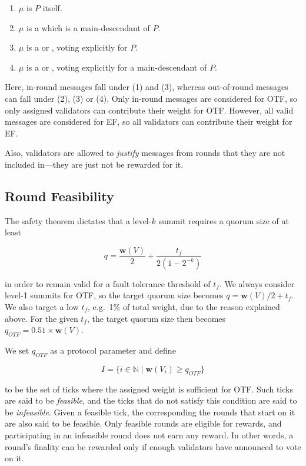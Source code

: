 \begin{enumerate}
\def\labelenumi{\arabic{enumi}.}
\item $\mu$ is $P$ itself.
\item $\mu$ is a \PROP which is a main-descendant of $P$.
\item $\mu$ is a \CONF or \WIT, voting explicitly for $P$.
\item $\mu$ is a \CONF or \WIT, voting explicitly for a main-descendant of $P$.
\end{enumerate}

Here, in-round messages fall under (1) and (3), whereas out-of-round messages can fall under (2), (3) or (4). Only in-round messages are considered for OTF, so only assigned validators can contribute their weight for OTF. However, all valid messages are considered for EF, so all validators can contribute their weight for EF.

Also, validators are allowed to \emph{justify} messages from rounds that they are not included in---they are just not be rewarded for it.

\subsection{Round Feasibility}
\label{sec:round-feasibility}

The safety theorem dictates that a level-$k$ summit requires a quorum size of at least

\begin{equation}
q = \frac{\boldsymbol{w}(V)}{2} + \frac{t_f}{2(1-2^{-k})}
\end{equation}

in order to remain valid for a fault tolerance threshold of $t_f$. We always consider level-1 summits for OTF, so the target quorum size becomes $q=\boldsymbol{w}(V)/2+t_f$. We also target a low $t_f$, e.g.~1\% of total weight, due to the reason explained above. For the given $t_f$, the target quorum size then becomes $q_{OTF} = 0.51 \times \boldsymbol{w}(V)$.

We set $q_{OTF}$ as a protocol parameter and define

\begin{equation}
I = \{i\in \mathbb{N} \mid \boldsymbol{w}(V_i)\geq q_{OTF}\}
\end{equation}

to be the set of ticks where the assigned weight is sufficient for OTF. Such ticks are said to be \emph{feasible}, and the ticks that do not satisfy this condition are said to be \emph{infeasible}. Given a feasible tick, the corresponding the rounds that start on it are also said to be feasible. Only feasible rounds are eligible for rewards, and participating in an infeasible round does not earn any reward. In other words, a round's finality can be rewarded only if enough validators have announced to vote on it.

